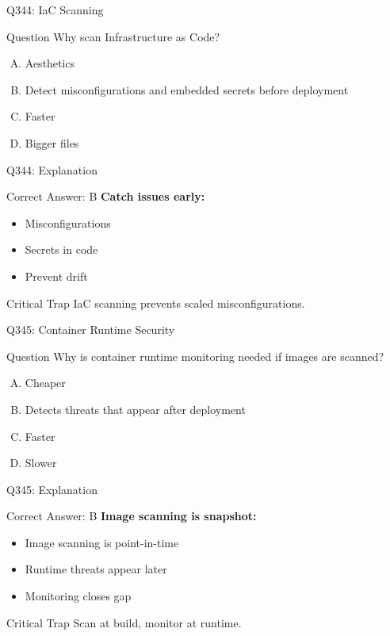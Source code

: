 \documentclass{beamer}
\begin{document}
	\begin{frame}{Q344: IaC Scanning}
		\begin{block}{Question}
			Why scan Infrastructure as Code?
		\end{block}
		\begin{enumerate}[(A)]
			\item Aesthetics
			\item Detect misconfigurations and embedded secrets before deployment
			\item Faster
			\item Bigger files
		\end{enumerate}
	\end{frame}
	
	\begin{frame}{Q344: Explanation}
		\begin{block}{Correct Answer: B}
			\textbf{Catch issues early:}
			\begin{itemize}
				\item Misconfigurations
				\item Secrets in code
				\item Prevent drift
			\end{itemize}
		\end{block}
		\begin{alertblock}{Critical Trap}
			IaC scanning prevents scaled misconfigurations.
		\end{alertblock}
	\end{frame}
	
	\begin{frame}{Q345: Container Runtime Security}
		\begin{block}{Question}
			Why is container runtime monitoring needed if images are scanned?
		\end{block}
		\begin{enumerate}[(A)]
			\item Cheaper
			\item Detects threats that appear after deployment
			\item Faster
			\item Slower
		\end{enumerate}
	\end{frame}
	
	\begin{frame}{Q345: Explanation}
		\begin{block}{Correct Answer: B}
			\textbf{Image scanning is snapshot:}
			\begin{itemize}
				\item Image scanning is point-in-time
				\item Runtime threats appear later
				\item Monitoring closes gap
			\end{itemize}
		\end{block}
		\begin{alertblock}{Critical Trap}
			Scan at build, monitor at runtime.
		\end{alertblock}
	\end{frame}
	
\end{document}

